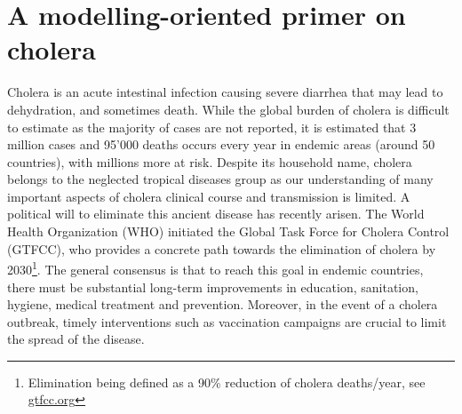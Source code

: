 \chapter{A modelling-oriented primer on cholera}
Cholera is an acute intestinal infection causing severe diarrhea that may lead to dehydration, and sometimes death. While the global burden of cholera is difficult to estimate as the majority of cases are not reported, it is estimated that 3 million cases and 95'000 deaths occurs every year in endemic areas (around 50 countries), with millions more at risk\cite{Ali:UpdatedGlobalBurden:2015}. Despite its household name, cholera belongs to the neglected tropical diseases group as our understanding of many important aspects of cholera clinical course and transmission is limited.
A political will to eliminate this ancient disease has recently arisen. The World Health Organization (WHO) initiated the Global Task Force for Cholera Control (GTFCC), who provides a concrete path towards the elimination of cholera by 2030\footnote{Elimination being defined as a 90\% reduction of cholera deaths/year, see \url{gtfcc.org}}. The general consensus is that to reach this goal in endemic countries, there must be substantial long-term improvements in education, sanitation, hygiene, medical treatment and prevention.  Moreover, in the event of a cholera outbreak, timely interventions such as vaccination campaigns are crucial to limit the spread of the disease. %

